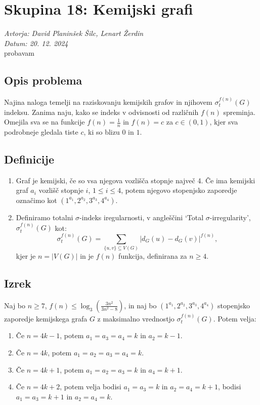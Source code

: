 \documentclass{article}
\begin{document}
\section*{Skupina 18: Kemijski grafi}
\textit{Avtorja: David Planinšek Šilc, Lenart Žerdin \\ Datum: 20. 12. 2024 \\}
probavam
\subsection*{Opis problema}
Najina naloga temelji na raziskovanju kemijskih grafov in njihovem
$\sigma_t^{f(n)}(G)$ indeksu. Zanima naju, kako se indeks v odvisnosti od
različnih $f(n)$ spreminja. Omejila
sva se na funkcije $f(n) = \frac{1}{n}$ in $f(n) = c$ za 
$c \in (0, 1)$, kjer sva podrobneje gledala tiste $c$, ki so 
blizu $0$ in $1$.

\subsection*{Definicije}

\begin{enumerate}
    \item Graf je kemijski, če so vsa njegova vozlišča stopnje največ 4.
        Če ima kemijski graf $a_i$ vozlišč stopnje $i$, $1 \leq i \leq 4$,
        potem njegovo stopenjsko zaporedje označimo kot $(1^{a_1}, 2^{a_2}, 3^{a_3}, 4^{a_4})$. 

    \item Definiramo totalni $\sigma$-indeks iregularnosti, v angleščini
        `Total $\sigma$-irregularity', $\sigma_t^{f(n)}(G)$ kot:
        \[
        \sigma_t^{f(n)}(G) = \sum_{\{u,v\} \subseteq V(G)} \left| d_G(u) - d_G(v) \right|^{f(n)},
        \]
        kjer je $n = |V(G)|$ in je $f(n)$ funkcija, definirana za $n \geq 4$. 
\end{enumerate}

\subsection*{Izrek}
Naj bo $n \geq 7$, $f(n) \leq \log_3 \left( \frac{3n^2}{3n^2 - 8} \right)$, in naj bo $(1^{a_1}, 2^{a_2}, 3^{a_3}, 4^{a_4})$ stopenjsko zaporedje kemijskega grafa $G$ z maksimalno vrednostjo $\sigma_t^{f(n)}(G)$. Potem velja:
\begin{enumerate}
    \item Če $n = 4k - 1$, potem $a_1 = a_3 = a_4 = k$ in $a_2 = k - 1$.
    \item Če $n = 4k$, potem $a_1 = a_2 = a_3 = a_4 = k$.
    \item Če $n = 4k + 1$, potem $a_1 = a_2 = a_3 = k$ in $a_4 = k + 1$.
    \item Če $n = 4k + 2$, potem velja bodisi $a_1 = a_3 = k$ in $a_2 = a_4 = k + 1$, bodisi $a_1 = a_3 = k + 1$ in $a_2 = a_4 = k$. 
\end{enumerate}
\end{document}
